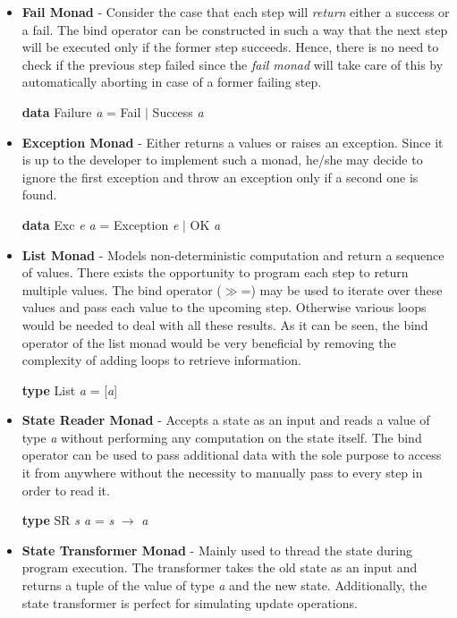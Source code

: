 \documentclass[a4paper, onecolumn]{article}
\begin{document}
\begin{itemize}
    \item \textbf{Fail Monad} - Consider the case that each step will \textit{return} either a success or a fail. The bind operator can be constructed in such a way that the next step will be executed only if the former step succeeds. Hence, there is no need to check if the previous step failed since the \textit{fail monad} will take care of this by automatically aborting in case of a former failing step.
    \begin{center}
        \textbf{data} Failure \textit{a} = Fail $\vert$ Success \textit{a} 
    \end{center}
    \item \textbf{Exception Monad} - Either returns a values or raises an exception. Since it is up to the developer to implement such a monad, he/she may decide to ignore the first exception and throw an exception only if a second one is found. 
    \begin{center}
        \textbf{data} Exc \textit{e a} = Exception \textit{e} $\vert$ OK \textit{a}
    \end{center}
    \item \textbf{List Monad} - Models non-deterministic computation and return a sequence of values. There exists the opportunity to program each step to return multiple values. The bind operator ($\gg$=) may be used to iterate over these values and pass each value to the upcoming step. Otherwise various loops would be needed to deal with all these results. As it can be seen, the bind operator of the list monad would be very beneficial by removing the complexity of adding loops to retrieve information. 
    \begin{center}
        \textbf{type} List \textit{a} = [\textit{a}]
    \end{center}
    \item \textbf{State Reader Monad} - Accepts a state as an input and reads a value of type \textit{a} without performing any computation on the state itself. The bind operator can be used to pass additional data with the sole purpose to access it from anywhere without the necessity to manually pass to every step in order to read it. 
    \begin{center}
        \textbf{type} SR \textit{s a} = \textit{s} $\rightarrow$ \textit{a}
    \end{center}
    \item \textbf{State Transformer Monad} - Mainly used to thread the state during program execution. The transformer takes the old state as an input and returns a tuple of the value of type \textit{a} and the new state. Additionally, the state transformer is perfect for simulating update operations.

\end{itemize}
\end{document}
